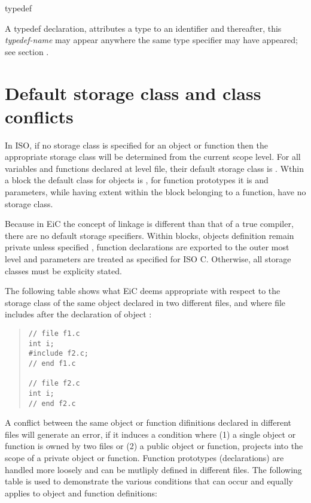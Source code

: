 \begin{Ventry}{typedef}
\item[typedef]
\label{item:typedef}

A typedef declaration, attributes a type to an identifier and
thereafter, this {\it typedef-name} may appear anywhere the same type
specifier may have appeared; see section .


\end{Ventry}
\normalsize


\section{Default storage class and class conflicts}
\label{sec:DefaultStorageClass}

In ISO, if no storage class is specified for an object or function
then the appropriate storage class will be determined from the current
scope level. For all variables and functions declared at level file,
their default storage class is . Wthin a block the default
class for objects is
, for function prototypes it is  and parameters,
while having extent within the block belonging to a function, have no
storage class.

Because in EiC the concept of linkage is different than that of a true
compiler, there are no default storage specifiers. Within blocks,
objects definition remain private unless specified ,
function declarations are exported to the outer most level and
parameters are treated as specified for ISO C. Otherwise, all storage
classes must be explicity stated.

The following table shows what EiC deems appropriate with respect to
the storage class of the same object  declared in two
different files, and where file  includes  after the
declaration of object :

\begin{quote}
\begin{verbatim}
// file f1.c 
int i;
#include f2.c;
// end f1.c 

// file f2.c
int i;
// end f2.c
\end{verbatim}
\end{quote}

A conflict between the same object or function difinitions declared in
different files will generate an error, if it induces a condition
where (1) a single object or function is owned by two files or (2) a public
object or function, projects into the scope of a private object or
function.  Function prototypes (declarations) are handled more loosely
and can be mutliply defined in different files. The following table is
used to demonstrate the various conditions that can occur and equally
applies to object and function definitions:


